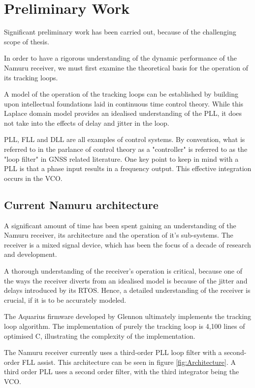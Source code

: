 \chapter{Preliminary Work}\label{ch:PreliminaryWork}
Significant preliminary work has been carried out, because of the challenging scope of thesis. 

In order to have a rigorous understanding of the dynamic performance of the Namuru receiver, we must first examine the theoretical basis for the operation of its tracking loops. 

A model of the operation of the tracking loops can be established by building upon intellectual foundations laid in continuous time control theory. While this Laplace domain model provides an idealised understanding of the \ac{PLL}, it does not take into the effects of delay and jitter in the loop. 

\ac{PLL}, \ac{FLL} and \ac{DLL} are all examples of control systems. By convention, what is referred to in the parlance of control theory as a "controller" is referred to as the "loop filter" in \ac{GNSS} related literature. One key point to keep in mind with a \ac{PLL} is that a phase input results in a frequency output. This effective integration occurs in the \ac{VCO}.

\section{Current Namuru architecture}
A significant amount of time has been spent gaining an understanding of the Namuru receiver, its architecture and the operation of it's sub-systems. The receiver is a mixed signal device, which has been the focus of a decade of research and development. 

A thorough understanding of the receiver's operation is critical, because one of the ways the receiver diverts from an idealised model is because of the jitter and delays introduced by its \ac{RTOS}. Hence, a detailed understanding of the receiver is crucial, if it is to be accurately modeled. 

The Aquarius firmware developed by Glennon \cite{Glennon11aquariusfirmware} ultimately implements the tracking loop algorithm. The implementation of purely the tracking loop is 4,100 lines of optimised C, illustrating the complexity of the implementation.

The Namuru receiver currently uses a third-order \ac{PLL} loop filter with a second-order \ac{FLL} assist. This architecture can be seen in figure \ref{fig:Architecture}.  A third order \ac{PLL} uses a second order filter, with the third integrator being the \ac{VCO}.

